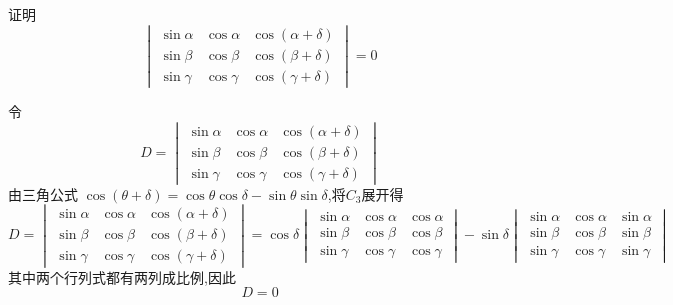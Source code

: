\begin{questions}
    \question 证明
    \[
    \begin{vmatrix} 
    \sin\alpha & \cos\alpha & \cos(\alpha+\delta) \\ 
    \sin\beta & \cos\beta & \cos(\beta+\delta) \\ 
    \sin\gamma & \cos\gamma & \cos(\gamma+\delta) 
    \end{vmatrix} = 0
    \]
    \begin{solution}
        令\[
        D=    
        \begin{vmatrix} 
        \sin\alpha & \cos\alpha & \cos(\alpha+\delta) \\ 
        \sin\beta & \cos\beta & \cos(\beta+\delta) \\ 
        \sin\gamma & \cos\gamma & \cos(\gamma+\delta) 
        \end{vmatrix}
        \]
        由三角公式 $\cos(\theta+\delta) = \cos\theta\cos\delta - \sin\theta\sin\delta$,将$C_3$展开得
        \[
        D=\begin{vmatrix} \sin\alpha & \cos\alpha & \cos(\alpha+\delta) \\ \sin\beta & \cos\beta & \cos(\beta+\delta) \\ \sin\gamma & \cos\gamma & \cos(\gamma+\delta) \end{vmatrix} 
        = \cos\delta \begin{vmatrix} \sin\alpha & \cos\alpha & \cos\alpha \\ \sin\beta & \cos\beta & \cos\beta \\ \sin\gamma & \cos\gamma & \cos\gamma \end{vmatrix} 
        - \sin\delta \begin{vmatrix} \sin\alpha & \cos\alpha & \sin\alpha \\ \sin\beta & \cos\beta & \sin\beta \\ \sin\gamma & \cos\gamma & \sin\gamma \end{vmatrix} 
        \]
        其中两个行列式都有两列成比例,因此
        \[
        D=0
        \]
    \end{solution}
    

\end{questions}
